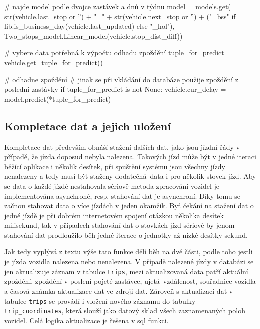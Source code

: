 \begin{code}[frame=none]
# najde model podle dvojce zastávek a dnů v týdnu
model = models.get(
  str(vehicle.last_stop or '') + "_" +
  str(vehicle.next_stop or '') +
  ("_bss" if lib.is_business_day(vehicle.last_updated) else "_hol"),
  Two_stops_model.Linear_model(vehicle.stop_dist_diff))

# vybere data potřebná k výpočtu odhadu zpoždění
tuple_for_predict = vehicle.get_tuple_for_predict()

# odhadne zpoždění
# jinak se při vkládání do databáze použije zpoždění z poslední zastávky
if tuple_for_predict is not None:
  vehicle.cur_delay = model.predict(*tuple_for_predict)
\end{code}

\subsection{Kompletace dat a jejich uložení}

Kompletace dat především obnáší stažení dalších dat, jako jsou jízdní řády v případě, že jízda doposud nebyla nalezena. Takových jízd může být v jedné iteraci běžící aplikace i několik desítek, při spuštění systému jsou všechny jízdy nenalezeny a tedy musí být staženy dodatečná data i pro několik stovek jízd. Aby se data o každé jízdě nestahovala sériově metoda zpracování vozidel je implementována asynchroně, resp. stahování dat je asynchroní. Díky tomu se začnou stahovat data o více jízdách v jeden okamžik. Byť čekání na stažení dat o jedné jízdě je při dobrém internetovém spojení otázkou několika desítek milisekund, tak v případech stahování dat o stovkách jízd sériově by jenom stahování dat prodloužilo běh jedné iterace o jednotky až nízké desítky sekund.

\bigbreak

Jak tedy vyplývá z textu výše tato funkce dělí běh na dvě části, podle toho jestli je jízda vozidla nalezena nebo nenalezena. V případě nalezené jízdy v databázi se jen aktualizuje záznam v tabulce \verb-trips-, mezi aktualizovaná data patří aktuální zpoždění, zpoždění v poslení pojeté zastávce, ujetá vzdálenost, souřadnice vozidla a časová známka aktualizace dat ve zdroji dat. Zároveň s aktualizací dat v tabulce \verb-trips- se provádí i vložení nového záznamu do tabulky \verb-trip_coordinates-, která slouží jako datový sklad všech zaznamenaných poloh vozidel. Celá logika aktualizace je řešena v \gls{sql} funkci.

